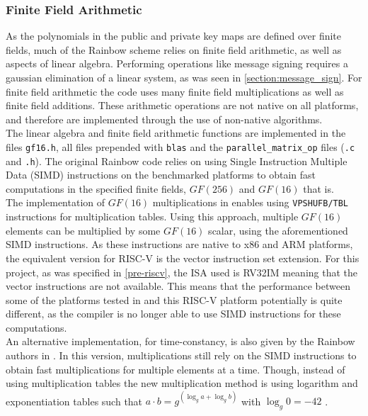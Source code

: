 \subsubsection{Finite Field Arithmetic} \label{implementation:ffa}
As the polynomials in the public and private key maps are defined over finite fields, much of the Rainbow scheme relies on finite field arithmetic, as well as aspects of linear algebra. Performing operations like message signing requires a gaussian elimination of a linear system, as was seen in \cref{section:message_sign}. For finite field arithmetic the code uses many finite field multiplications as well as finite field additions. These arithmetic operations are not native on all platforms, and therefore are implemented through the use of non-native algorithms.\medskip\\
The linear algebra and finite field arithmetic functions are implemented in the files \texttt{gf16.h}, all files prepended with \texttt{blas} and the \texttt{parallel\_matrix\_op} files (\texttt{.c} and \texttt{.h}). The original Rainbow code relies on using Single Instruction Multiple Data (SIMD) instructions on the benchmarked platforms to obtain fast computations in the specified finite fields, $GF(256)$ and $GF(16)$ that is.
\medskip\\
The implementation of $GF(16)$ multiplications in \cite{rainbownist} enables using \texttt{VPSHUFB/TBL} instructions for multiplication tables. Using this approach, multiple $GF(16)$ elements can be multiplied by some $GF(16)$ scalar, using the aforementioned SIMD instructions. As these instructions are native to x86 and ARM platforms, the equivalent version for RISC-V is the vector instruction set extension. For this project, as was specified in \cref{pre-riscv}, the ISA used is RV32IM meaning that the vector instructions are not available. This means that the performance between some of the platforms tested in \cite{rainbownist} and this RISC-V platform potentially is quite different, as the compiler is no longer able to use SIMD instructions for these computations.
\medskip\\
An alternative implementation, for time-constancy, is also given by the Rainbow authors in \cite{rainbownist}. In this version, multiplications still rely on the SIMD instructions to obtain fast multiplications for multiple elements at a time. Though, instead of using multiplication tables the new multiplication method is using logarithm and exponentiation tables such that $a \cdot b = g^{(\log_g a +  \log_g b)}$ with $\log_g 0 = -42$ \cite{rainbownist}.
